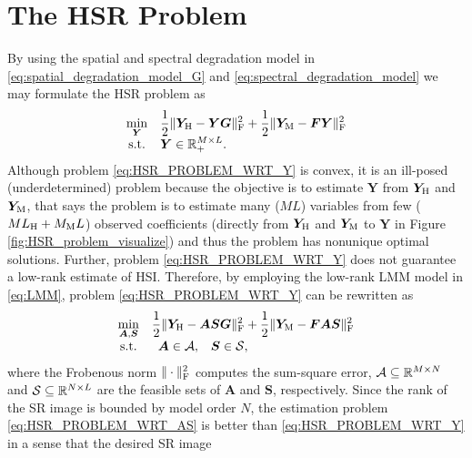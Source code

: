 \section{The HSR Problem}
By using the spatial and spectral degradation model in
\eqref{eq:spatial_degradation_model_G} and
\eqref{eq:spectral_degradation_model} we may formulate the HSR problem as
\begin{equation}
    \begin{array}{cl}
        \underset{\bm Y}{\min} &
        \displaystyle
        \frac{1}{2} \Vert \bm Y_\text H - \bm Y \bm G \Vert_\text F^2 +
        \frac{1}{2} \Vert \bm Y_\text M - \bm F \bm Y \Vert_\text F^2 \\
        \text{s.t.} &
        \bm Y \in \mathbb R_+^{M \times L}.
    \end{array}
    \label{eq:HSR_PROBLEM_WRT_Y}
\end{equation}
Although problem \eqref{eq:HSR_PROBLEM_WRT_Y} is convex, it is an ill-posed
(underdetermined) problem because the objective is to estimate $\bm Y$ from
$\bm Y_\text H$ and $\bm Y_\text M$, that says the problem is to estimate many ($ML$) variables
from few ($ML_\text H + M_\text ML$) observed coefficients (directly from
$\bm Y_\text H$ and $\bm Y_\text M$ to $\bm Y$ in Figure \ref{fig:HSR_problem_visualize}) and thus
the problem has nonunique optimal solutions.
Further, problem \eqref{eq:HSR_PROBLEM_WRT_Y} does not guarantee a low-rank
estimate of HSI.
Therefore, by employing the low-rank LMM model in \eqref{eq:LMM}, problem
\eqref{eq:HSR_PROBLEM_WRT_Y} can be rewritten as
\begin{equation}
    \begin{array}{cl}
        \underset{\bm A,\bm S}{\min} &
        \displaystyle
        \frac{1}{2} \Vert \bm Y_\text H - \bm A \bm S \bm G \Vert_\text F^2 +
        \frac{1}{2} \Vert \bm Y_\text M - \bm F \bm A \bm S \Vert_\text F^2 \\
        \text{s.t.} &
        \begin{array}{cc}
            \bm A \in \mathcal A, &
            \bm S \in \mathcal S,
        \end{array}
    \end{array}
    \label{eq:HSR_PROBLEM_WRT_AS}
\end{equation}
where the Frobenous norm $\Vert \cdot \Vert_\text F^2$ computes the sum-square
error, $\mathcal A \subseteq \mathbb R^{M \times N}$ and
$\mathcal S \subseteq \mathbb R^{N \times L}$ are the feasible sets of $\bm A$ and
$\bm S$, respectively.
Since the rank of the SR image is bounded by model order $N$, the estimation
problem \eqref{eq:HSR_PROBLEM_WRT_AS} is better than
\eqref{eq:HSR_PROBLEM_WRT_Y} in a sense that the desired SR image
